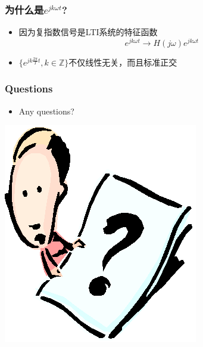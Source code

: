 \documentclass[CJKutf8,xcolor=pdftex,dvipsnames,table]{beamer}
\begin{document}
\begin{CJK*}{UTF8}{song}
  \begin{frame}
    \frametitle{为什么是$e^{jk\omega t}$?}
    \begin{itemize}
    \item 因为复指数信号是LTI系统的特征函数
    \[ e^{jk\omega t} \rightarrow H(j\omega)e^{jk\omega t} \]
    \item $\{e^{jk\frac{2\pi}{T} t}, k \in \mathbb{Z}\}$不仅线性无关，而且标准正交
    \end{itemize}
  \end{frame}  
    
  \begin{frame}
    \frametitle{Questions}
    \begin{itemize}
    \item Any questions?
    \end{itemize}
    \begin{center}
      \includegraphics[scale=.5]{question}
    \end{center}
  \end{frame}   
          
\end{CJK*}
\end{document}
